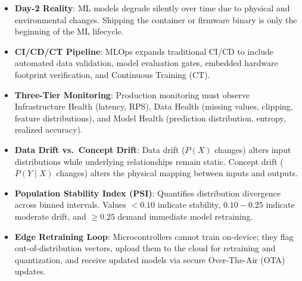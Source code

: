 \begin{takeaways}
\begin{itemize}
    \item \textbf{Day-2 Reality}: ML models degrade silently over time due to physical and environmental changes. Shipping the container or firmware binary is only the beginning of the ML lifecycle.
    \item \textbf{CI/CD/CT Pipeline}: MLOps expands traditional CI/CD to include automated data validation, model evaluation gates, embedded hardware footprint verification, and Continuous Training (CT).
    \item \textbf{Three-Tier Monitoring}: Production monitoring must observe Infrastructure Health (latency, RPS), Data Health (missing values, clipping, feature distributions), and Model Health (prediction distribution, entropy, realized accuracy).
    \item \textbf{Data Drift vs.\ Concept Drift}: Data drift ($P(X)$ changes) alters input distributions while underlying relationships remain static. Concept drift ($P(Y \mid X)$ changes) alters the physical mapping between inputs and outputs.
    \item \textbf{Population Stability Index (PSI)}: Quantifies distribution divergence across binned intervals. Values $< 0.10$ indicate stability, $0.10 - 0.25$ indicate moderate drift, and $\ge 0.25$ demand immediate model retraining.
    \item \textbf{Edge Retraining Loop}: Microcontrollers cannot train on-device; they flag out-of-distribution vectors, upload them to the cloud for retraining and quantization, and receive updated models via secure Over-The-Air (OTA) updates.
\end{itemize}
\end{takeaways}

